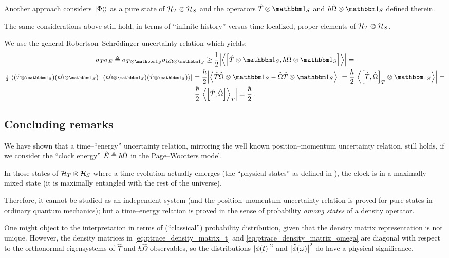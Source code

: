 Another approach considers $\left.\left| \Phi \right\rangle\hspace{-0.115em}\right\rangle$ as a pure state of $\mathcal{H}_T \otimes \mathcal{H}_S$
and the operators $\hat{T} \ox \idop_{S}$ and $\hbar\hat{\Omega} \ox \idop_{S}$
defined therein.

The same considerations above still hold, in terms of ``infinite history'' versus
time-localized, proper elements of $\mathcal{H}_T \otimes \mathcal{H}_S$. 

We use the general Robertson--Schr\"{o}dinger uncertainty relation which yields:
\begin{multline}
  \sigma_T \sigma_E \eqbydef
  \sigma_{T \ox \idop_S} \sigma_{\hbar\Omega \ox \idop_S} \geq
  \frac{1}{2} \abs{\expval{\comm
    {\hat{T}\ox\idop_S} {\hbar\hat{\Omega}\ox\idop_S}
  }} =
  \\
  {\scriptstyle
    \frac{1}{2} \abs{\expval{
      \qty(\hat{T}\ox\idop_S) \qty(\hbar\hat{\Omega}\ox\idop_S) -
      \qty(\hbar\hat{\Omega}\ox\idop_S) \qty(\hat{T}\ox\idop_S)
    }}
  } =
  \frac{\hbar}{2} \abs{\expval{
    \hat{T}\hat{\Omega}\ox\idop_S - \hat{\Omega}\hat{T}\ox\idop_S
  }} =
  \frac{\hbar}{2} \abs{\expval{
    \comm{\hat{T}}{\hat{\Omega}}_T \ox \idop_S
  }} =
  \\
  \frac{\hbar}{2} \abs{\expval{\comm
    {\hat{T}}{\hat{\Omega}}
  }_T} =
  \frac{\hbar}{2}
  \,\text{.}
\end{multline}

\subsection{Concluding remarks}

We have shown that a time--``energy'' uncertainty relation,
mirroring the well known position--momentum uncertainty relation,
still holds, if we consider the ``clock energy'' $\hat{E} \triangleq \hbar\hat{\Omega}$
in the Page--Wootters model.

In those states of $\mathcal{H}_T \otimes \mathcal{H}_S$ where a time evolution actually emerges
(the ``physical states'' as defined in \cite{Lloyd:Time}),
the clock is in a maximally mixed state
(it is maximally entangled with the rest of the universe).

Therefore, it cannot be studied as an independent system
(and the position--momentum uncertainty relation is proved
for pure states in ordinary quantum mechanics); but a
time--energy relation is proved in the sense of probability
\emph{among states} of a density operator.

One might object to the interpretation in terms of (``classical'')
probability distribution, given
that the density matrix representation is
not unique.
However, the density matrices
in \eqref{eq:ptrace_density_matrix_t} and \eqref{eq:ptrace_density_matrix_omega}
are diagonal with respect to
the orthonormal eigensystems of $\hat{T}$ and $\hbar \hat{\Omega}$ observables,
so the distributions $\abs{\phi(t)}^2$ and $\abs{\tilde{\phi}(\omega)}^2$
do have a physical significance.
